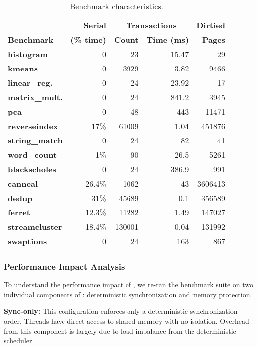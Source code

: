 \begin{table}[!t]
\centering
\begin{tabular}{l|rrrr}
&
{\bf  Serial} &
\multicolumn{2}{c}{\bf  Transactions} &
{\bf  Dirtied}
\\
{\bf  Benchmark} &
{\bf  (\% time)} &
{\bf  Count} &
{\bf  Time (ms)} &
{\bf  Pages}\\
\hline
 \textbf{histogram} &  0 &  23 &  15.47 &  29\\
 \textbf{kmeans} &  0 &  3929 &  3.82 &  9466\\
 \textbf{linear\_reg.} &  0 &  24 &  23.92 &  17\\
 \textbf{matrix\_mult.} &  0 &  24 &  841.2 &  3945\\
 \textbf{pca} &  0 &  48 &  443 &  11471\\
 \textbf{reverseindex} &  17\% &  61009 &  1.04 &  451876\\
 \textbf{string\_match} &  0 &  24 &  82 &  41\\
 \textbf{word\_count} &  1\% &  90 &  26.5 &  5261\\
 \textbf{blackscholes} &  0 &  24 &  386.9 &  991\\
 \textbf{canneal} &  26.4\% &  1062 &  43 &  3606413\\
 \textbf{dedup} &  31\% &  45689 &  0.1 &  356589\\
 \textbf{ferret} &  12.3\% &  11282 &  1.49 &  147027 \\
 \textbf{streamcluster} &  18.4\% &  130001 &  0.04 &  131992\\
 \textbf{swaptions} &  0 &  24 &  163 &  867\\
\end{tabular}
\caption{Benchmark characteristics.\label{tbl:characteristics}}
\end{table}

\subsubsection{Performance Impact Analysis}
\label{sec:investigation}
To understand the performance impact of \dthreads{}, we re-ran the benchmark suite on two individual components of \dthreads{}: deterministic synchronization and memory protection.

\textbf{Sync-only:}
This configuration enforces only a deterministic synchronization order.  Threads have direct access to shared memory with no isolation.  Overhead from this component is largely due to load imbalance from the deterministic scheduler.

